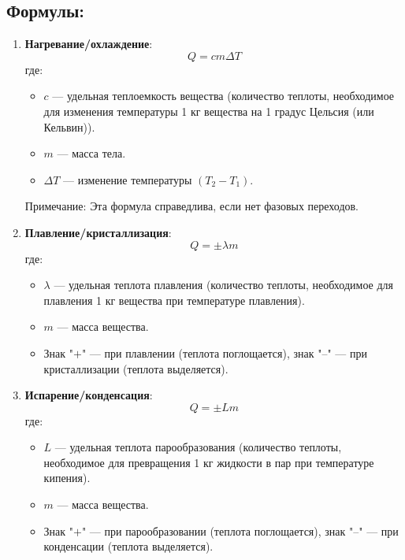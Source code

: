 \documentclass[a4paper,12pt]{article}
\begin{document}
\subsection*{Формулы:}
\vspace{-3pt}
\begin{enumerate}[itemsep=0pt, topsep=0pt, parsep=3pt]
    \item \textbf{Нагревание/охлаждение}:
    \vspace{-0.05em}
    $$ Q = cm \Delta T $$
    где:
    \begin{itemize}
        \item $c$ — удельная теплоемкость вещества (количество теплоты, необходимое для изменения температуры 1 кг вещества на 1 градус Цельсия (или Кельвин)).
        \item $m$ — масса тела.
        \item $\Delta T$ — изменение температуры $(T_2 - T_1)$.
    \end{itemize}
    \vspace{-0.05em}
    \par
    Примечание: Эта формула справедлива, если нет фазовых переходов.

    \item \textbf{Плавление/кристаллизация}:
    \vspace{-0.05em}
    $$ Q = \pm \lambda m $$
    где:
    \begin{itemize}
        \item $\lambda$ — удельная теплота плавления (количество теплоты, необходимое для плавления 1 кг вещества при температуре плавления).
        \item $m$ — масса вещества.
        \item Знак "$+$" — при плавлении (теплота поглощается), знак "$–$" — при кристаллизации (теплота выделяется).
    \end{itemize}

    \item \textbf{Испарение/конденсация}:
    \vspace{-0.05em}
    $$ Q = \pm Lm $$
    где:
    \begin{itemize}
        \item $L$ — удельная теплота парообразования (количество теплоты, необходимое для превращения 1 кг жидкости в пар при температуре кипения).
        \item $m$ — масса вещества.
        \item Знак "$+$" — при парообразовании (теплота поглощается), знак "$–$" — при конденсации (теплота выделяется).
    \end{itemize}
\end{enumerate}
\vspace{-9pt}
\newpage
\end{document}
